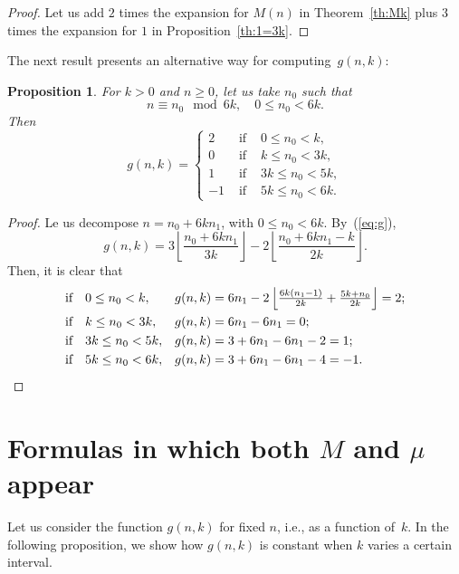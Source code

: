 \documentclass[10pt]{amsart}
\newtheorem{propo}[theor]{Proposition}
\begin{document}
\begin{proof}
Let us add $2$ times the expansion for $M(n)$ in Theorem~\ref{th:Mk}
plus $3$ times the expansion for $1$ in Proposition~\ref{th:1=3k}.
\end{proof}

The next result presents an alternative way for computing~$g(n,k)$:

\begin{propo}
\label{th:gnk}
For $k>0$ and $n\ge0$, let us take $n_0$ such that
$$
n\equiv n_0 \mod 6k,\quad 0\leq n_0<6k.
$$
Then
\begin{equation}
\label{eq:gnk}
g(n,k) = \left\{
\begin{array}{lll}
2 & \mbox{ if } & 0 \leq n_0 < k,\\
0 & \mbox{ if } & k \leq n_0 < 3k,\\
1 &  \mbox{ if } & 3k \leq n_0 < 5k,\\
-1 & \mbox{ if } & 5k \leq n_0 < 6k.
\end{array}
\right.
\end{equation}
\end{propo}

\begin{proof}
Le us decompose $n = n_0+6kn_1$, with  $0 \leq n_0 < 6k$. By~(\ref{eq:g}),
$$
g(n,k)
= 3 \left\lfloor \frac{n_0+6kn_1}{3k} \right\rfloor
- 2 \left\lfloor \frac{n_0+6kn_1-k}{2k} \right\rfloor.
$$
Then, it is clear that
\begin{align*}
\mbox{if\quad} & 0\leq n_0<k, & g(n,k)
&= 6n_1-2 \left\lfloor \tfrac{6k(n_1-1)}{2k}
+ \tfrac{5k+n_0}{2k} \right\rfloor = 2;\\
\mbox{if\quad} & k\leq n_0 < 3k, & g(n,k) &= 6n_1-6n_1 = 0;\\
\mbox{if\quad} & 3k \leq n_0 < 5k, & g(n,k) &= 3+6n_1-6n_1-2 = 1;\\
\mbox{if\quad} & 5k \leq n_0 < 6k, & g(n,k) &= 3+6n_1-6n_1-4 = -1.\qedhere
\end{align*}

\end{proof}

\section{Formulas in which both $M$ and $\mu$ appear}
\label{sec:Mmu}

Let us consider the function $g(n,k)$ for fixed $n$, i.e., as a function of~$k$.
In the following proposition, we show how $g(n,k)$ is constant when $k$ varies
a certain interval.
\end{document}
